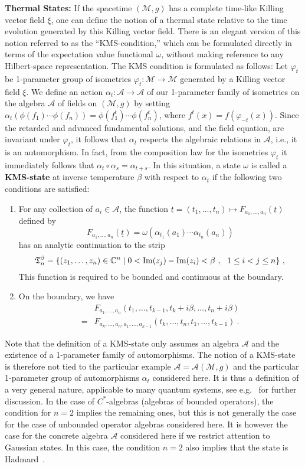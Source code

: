 \documentclass[12pt]{article}
\newcommand{\CC}{\mathbb{C}}
\newcommand{\eA}{\mathscr{A}}
\renewcommand{\Im}{\mathrm{Im}}
\newcommand{\M}{\mathscr{M}}
\theoremstyle{plain}
\theoremstyle{definition}
\def\ben{\begin{equation}}
\def\een{\end{equation}}
\begin{document}
\vspace{.5cm}
%
{\bf Thermal States:} If the spacetime $(\M, g)$ has a complete time-like Killing vector field $\xi$,
one can define the notion of a thermal state relative to the time evolution
generated by this Killing vector field. There is an elegant version of this
notion referred to as the ``KMS-condition,'' which can be formulated directly
in terms of the expectation value functional $\omega$, without making
reference to any Hilbert-space representation.
The KMS condition is formulated as follows:
Let $\varphi_t$ be
1-parameter group of isometries $\varphi_t: \M \to \M$ generated by a Killing vector field $\xi$. We
define an action $\alpha_t: \eA \to \eA$ of our 1-parameter family of
isometries on the algebra $\eA$ of fields on $(\M,g)$ by setting
$\alpha_t(\phi(f_1) \cdots \phi(f_n)) = \phi(f^t_1) \cdots
\phi(f^t_n)$, where $f^t(x) = f(\varphi_{-t}(x))$. Since the retarded
and advanced fundamental solutions, and the field equation, are invariant under
$\varphi_t$, it follows that $\alpha_t$ respects the algebraic
relations in $\eA$, i.e., it is an automorphism. In fact, from the
composition law for the isometries $\varphi_t$ it immediately follows
that $\alpha_t \circ \alpha_s = \alpha_{t+s}$.
In this situation, a state $\omega$ is called a {\bf KMS-state} at inverse temperature $\beta$
with respect to $\alpha_t$ if the following two conditions are
satisfied:  
\begin{enumerate}
\item For any collection of $a_i \in
  \eA$, the function $\underline t=(t_1, \dots, t_n) \mapsto F_{a_1, ..., a_n}(\underline t)$  defined by
\ben
 F_{a_1, ..., a_n}(\underline t) = \omega(\alpha_{t_1}(a_1) \cdots \alpha_{t_n}(a_n))
\een
has an analytic continuation to the strip
\ben
{\frak T}^\beta_n = \{ (z_1, \dots, z_n) \in \CC^n \mid 0 < \Im(z_j) - \Im(z_i) < \beta \ , \ \
1 \le i < j \le n \} \ ,
\een
This function is required to be bounded and continuous at the boundary.
\item On the boundary, we have
\ben\label{kmscond}
\begin{split}
&F_{a_1, ..., a_n}(t_1, \dots, t_{k-1}, t_k + i\beta, \dots, t_n+i\beta) \\
=&F_{a_k, ..., a_n, a_1, ... , a_{k-1}}(t_k, \dots, t_n, t_1, \dots, t_{k-1}) \ .
\end{split}
\een
\end{enumerate}
Note that the definition of a KMS-state only assumes an algebra $\eA$
and the existence of a 1-parameter family of automorphisms. The notion
of a KMS-state is therefore not tied to the particular example $\eA =
\eA(\M,g)$ and the particular 1-parameter group of automorphisms
$\alpha_t$ considered here. It is thus a definition of a very general
nature, applicable to many quantum systems, see e.g.~\cite{bratelli} for further discussion. 
In the case of $C^*$-algebras (algebras of
bounded operators),
the condition for $n=2$ implies the remaining ones, but this is not generally
the case for the case of unbounded operator algebras considered here. It is
however the case for the concrete algebra $\eA$ considered here
if we restrict attention to Gaussian states. In this case, the condition $n=2$
also implies that the state is Hadmard~\cite{sahlmann}. 
\end{document}

